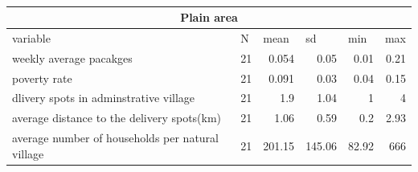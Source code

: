 \documentclass{article}
\begin{document}
\paragraph{ \newline}
   
\begin{tabular}{|l|r|r|r|r|r|}
    \toprule
    \multicolumn{6}{|c|}{Plain area} \\
    \midrule
    variable & \multicolumn{1}{l|}{N} & \multicolumn{1}{l|}{mean} & \multicolumn{1}{l|}{sd} & \multicolumn{1}{l|}{min} & \multicolumn{1}{l|}{max} \\
    \midrule
    weekly average pacakges & 21    & 0.054 & 0.05  & 0.01  & 0.21 \\
    \midrule
    poverty rate & 21    & 0.091 & 0.03  & 0.04  & 0.15 \\
    \midrule
    dlivery spots in adminstrative village & 21    & 1.9   & 1.04  & 1     & 4 \\
    \midrule
    average distance to the delivery spots(km) & 21    & 1.06  & 0.59  & 0.2   & 2.93 \\
    \midrule
    average number of households per natural village & 21    & 201.15 & 145.06 & 82.92 & 666 \\
    \bottomrule
    \end{tabular}%
\end{document}

